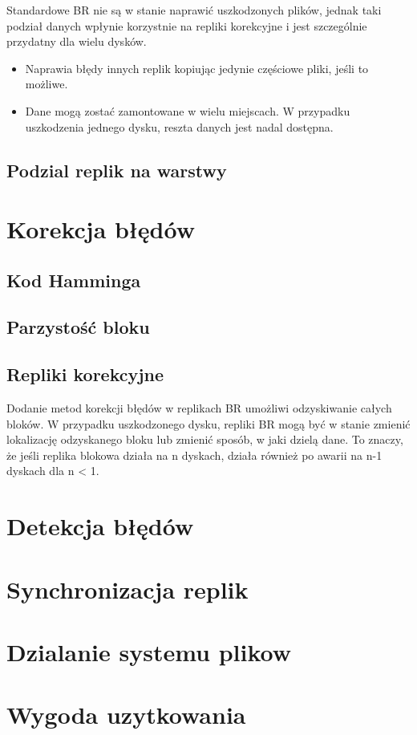 Standardowe BR nie są w stanie naprawić uszkodzonych plików, jednak taki podział danych wpłynie korzystnie na repliki korekcyjne i jest szczególnie przydatny dla wielu dysków.
\begin{itemize}
    \item Naprawia błędy innych replik kopiując jedynie częściowe pliki, jeśli to możliwe.
    \item Dane mogą zostać zamontowane w wielu miejscach. W przypadku uszkodzenia jednego dysku, reszta danych jest nadal dostępna.
\end{itemize}

\subsection{Podzial replik na warstwy}

\section {Korekcja błędów}
\subsection{Kod Hamminga}
\subsection{Parzystość bloku}
\subsection{Repliki korekcyjne}

Dodanie metod korekcji błędów w replikach BR umożliwi odzyskiwanie całych bloków. W przypadku uszkodzonego dysku, repliki BR mogą być w stanie zmienić lokalizację odzyskanego bloku lub zmienić sposób, w jaki dzielą dane. To znaczy, że jeśli replika blokowa działa na n dyskach, działa również po awarii na n-1 dyskach dla n < 1.

\section {Detekcja błędów}

\section {Synchronizacja replik}

\section {Dzialanie systemu plikow}

\section {Wygoda uzytkowania}
